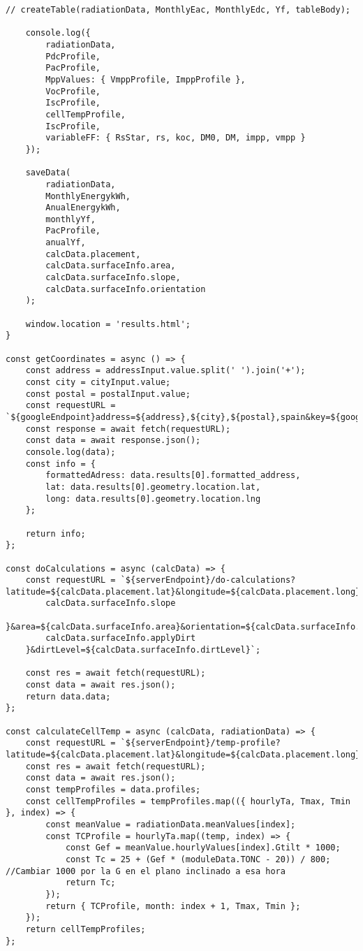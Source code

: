 \begin{lstlisting}[style=ES6, caption={public/scripts/DataAquisition.js}]
	// createTable(radiationData, MonthlyEac, MonthlyEdc, Yf, tableBody);

	console.log({
		radiationData,
		PdcProfile,
		PacProfile,
		MppValues: { VmppProfile, ImppProfile },
		VocProfile,
		IscProfile,
		cellTempProfile,
		IscProfile,
		variableFF: { RsStar, rs, koc, DM0, DM, impp, vmpp }
	});

	saveData(
		radiationData,
		MonthlyEnergykWh,
		AnualEnergykWh,
		monthlyYf,
		PacProfile,
		anualYf,
		calcData.placement,
		calcData.surfaceInfo.area,
		calcData.surfaceInfo.slope,
		calcData.surfaceInfo.orientation
	);

	window.location = 'results.html';
}

const getCoordinates = async () => {
	const address = addressInput.value.split(' ').join('+');
	const city = cityInput.value;
	const postal = postalInput.value;
	const requestURL = `${googleEndpoint}address=${address},${city},${postal},spain&key=${googleApiKey}`;
	const response = await fetch(requestURL);
	const data = await response.json();
	console.log(data);
	const info = {
		formattedAdress: data.results[0].formatted_address,
		lat: data.results[0].geometry.location.lat,
		long: data.results[0].geometry.location.lng
	};

	return info;
};

const doCalculations = async (calcData) => {
	const requestURL = `${serverEndpoint}/do-calculations?latitude=${calcData.placement.lat}&longitude=${calcData.placement.long}&angle=${
		calcData.surfaceInfo.slope
	}&area=${calcData.surfaceInfo.area}&orientation=${calcData.surfaceInfo.orientation}&applyDirtLevel=${
		calcData.surfaceInfo.applyDirt
	}&dirtLevel=${calcData.surfaceInfo.dirtLevel}`;

	const res = await fetch(requestURL);
	const data = await res.json();
	return data.data;
};

const calculateCellTemp = async (calcData, radiationData) => {
	const requestURL = `${serverEndpoint}/temp-profile?latitude=${calcData.placement.lat}&longitude=${calcData.placement.long}`;
	const res = await fetch(requestURL);
	const data = await res.json();
	const tempProfiles = data.profiles;
	const cellTempProfiles = tempProfiles.map(({ hourlyTa, Tmax, Tmin }, index) => {
		const meanValue = radiationData.meanValues[index];
		const TCProfile = hourlyTa.map((temp, index) => {
			const Gef = meanValue.hourlyValues[index].Gtilt * 1000;
			const Tc = 25 + (Gef * (moduleData.TONC - 20)) / 800; //Cambiar 1000 por la G en el plano inclinado a esa hora
			return Tc;
		});
		return { TCProfile, month: index + 1, Tmax, Tmin };
	});
	return cellTempProfiles;
};


\end{lstlisting}
